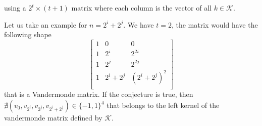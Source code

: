using a  $2^t \times (t + 1)$ matrix where each column is the vector of all $k \in \mathcal{K}$.

Let us take an example for $n = 2^i + 2^j$. We have $t = 2$, the matrix would have the following shape
$$
\begin{bmatrix}
    1 & 0 & 0\\
    1 & 2^i & 2^{2i}\\
    1 & 2^j & 2^{2j}\\
    1 & 2^i + 2^j & (2^i + 2^j)^2\\
\end{bmatrix}
$$
that is a Vandermonde matrix. If the conjecture is true, then $\nexists (v_0, v_{2^i}, v_{2^j}, v_{2^i + 2^j}) \in \{-1, 1\}^4$ that belongs to the left kernel of the vandermonde matrix defined by $\mathcal{K}$.
